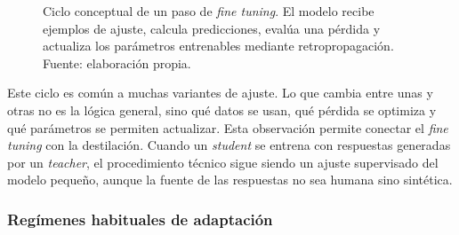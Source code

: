 \begin{figure}[H]
\centering
\setlength{\fboxsep}{8pt}
\caption{Ciclo conceptual de un paso de \textit{fine tuning}. El modelo recibe ejemplos de ajuste, calcula predicciones, evalúa una pérdida y actualiza los parámetros entrenables mediante retropropagación. Fuente: elaboración propia.}
\label{fig:fine_tuning_ciclo}
\end{figure}

Este ciclo es común a muchas variantes de ajuste. Lo que cambia entre unas y otras no es la lógica general, sino qué datos se usan, qué pérdida se optimiza y qué parámetros se permiten actualizar. Esta observación permite conectar el \textit{fine tuning} con la destilación. Cuando un \textit{student} se entrena con respuestas generadas por un \textit{teacher}, el procedimiento técnico sigue siendo un ajuste supervisado del modelo pequeño, aunque la fuente de las respuestas no sea humana sino sintética.

\subsubsection{Regímenes habituales de adaptación}

